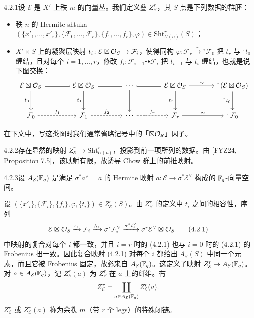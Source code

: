 \begin{defn}{4.2.1}设 $\mathcal E$ 是 $X'$ 上秩 $m$ 的向量丛。我们定义叠 $Z^r_{\mathcal E}$，其 $S$-点是下列数据的群胚：
\begin{itemize}
\item 秩 $n$ 的 Hermite shtuka $(\{x'_1,\dots,x'_r\},\{\mathcal F_0,\dots,\mathcal F_r\},\{f_1,\dots,f_r\},\varphi)\in\mathrm{Sht}^r_{U(n)}(S)$；
\item $X'\times S$ 上的凝聚层映射 $t_i\colon\mathcal E\boxtimes\mathcal{O}_S\to\mathcal F_i$，使得同构 $\varphi\colon\mathcal F_r\xrightarrow{\sim}{}^\tau\mathcal F_0$ 把 $t_r$ 与 ${}^\tau t_0$ 缠结，且对每个 $i=1,\dots,r$，修改 $f_i\colon\mathcal F_{i-1}\dashrightarrow\mathcal F_i$ 把 $t_{i-1}$ 与 $t_i$ 缠结，也就是说下图交换：
\[
\begin{tikzcd}[column sep=large, row sep=large]
\mathcal E\boxtimes\OO_S \arrow[r, equal] \arrow[d, "t_0"'] &
\mathcal E\boxtimes\OO_S \arrow[r, equal] \arrow[d, "t_1"'] &
\cdots \arrow[r, equal] \arrow[d] &
\mathcal E\boxtimes\OO_S \arrow[r, "\sim"] \arrow[d, "t_r"'] &
{}^\tau(\mathcal E\boxtimes\OO_S) \arrow[d, "{}^\tau t_0"'] \\
\mathcal F_0 \arrow[r, dashed, "f_1"] &
\mathcal F_1 \arrow[r, dashed, "f_2"] &
\cdots \arrow[r, dashed, "f_r"] &
\mathcal F_r \arrow[r, "\sim"] &
{}^\tau\mathcal F_0
\end{tikzcd}
\]
\end{itemize}
在下文中，写这类图时我们通常省略记号中的「$\boxtimes\mathcal{O}_S$」因子。
\end{defn}

\begin{rem}{4.2.2}存在显然的映射 $Z^r_{\mathcal E}\to\mathrm{Sht}^r_{U(n)}$，投影到前一项所列的数据。由 [FYZ24, Proposition 7.5]，该映射有限，故诱导 Chow 群上的前推映射。
\end{rem}

\begin{defn}{4.2.3}设 $A_{\mathcal E}(\mathbb{F}_q)$ 是满足 $\sigma^*a^\vee=a$ 的 Hermite 映射 $a\colon\mathcal E\to\sigma^*\mathcal E^\vee$ 构成的 $\mathbb{F}_q$-向量空间。

设 $(\{x'_i\},\{\mathcal F_i\},\{f_i\},\varphi,\{t_i\})\in Z^r_{\mathcal E}(S)$。由 $Z^r_{\mathcal E}$ 的定义中 $t_i$ 之间的相容性，序列
\begin{equation}
\mathcal E\boxtimes\mathcal{O}_S\xrightarrow{t_i}\mathcal F_i\xrightarrow{h_i}\sigma^*\mathcal F_i^\vee\xrightarrow{\sigma^*t_i^\vee}\sigma^*\mathcal E^\vee\boxtimes\mathcal{O}_S
\tag{4.2.1}\label{eq:a6-02-4-2-1}
\end{equation}
中映射的复合对每个 $i$ 都一致，并且 $i=r$ 时的 (4.2.1) 也与 $i=0$ 时的 (4.2.1) 的 Frobenius 扭一致。因此复合映射 (4.2.1) 对每个 $i$ 都给出 $A_{\mathcal E}(S)$ 中同一个元素，而且它被 Frobenius 固定，故必来自 $A_{\mathcal E}(\mathbb{F}_q)$。这定义了映射 $Z^r_{\mathcal E}\to A_{\mathcal E}(\mathbb{F}_q)$。对 $a\in A_{\mathcal E}(\mathbb{F}_q)$，记 $Z^r_{\mathcal E}(a)$ 为 $Z^r_{\mathcal E}$ 在 $a$ 上的纤维。有
\[
Z^r_{\mathcal E}=\coprod_{a\in A_{\mathcal E}(\mathbb{F}_q)}Z^r_{\mathcal E}(a).
\]
$Z^r_{\mathcal E}$ 或 $Z^r_{\mathcal E}(a)$ 称为余秩 $m$（带 $r$ 个 legs）的特殊闭链。
\end{defn}

